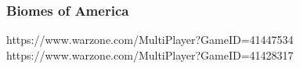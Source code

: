 \subsubsection{Biomes of America}

https://www.warzone.com/MultiPlayer?GameID=41447534
https://www.warzone.com/MultiPlayer?GameID=41428317